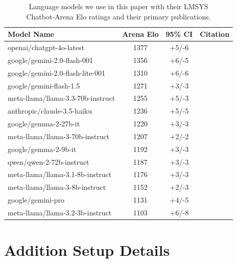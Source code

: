 \documentclass{article}
\begin{document}
\begin{table}[h]
    \centering
    \begin{tabular}{l|c|c|l}
        \toprule[0.4mm]
        \textbf{Model Name} & \textbf{Arena Elo} & \textbf{95\% CI} & \textbf{Citation} \\
        \midrule[0.4mm]
        openai/chatgpt-4o-latest           & 1377 & +5/-6  & \cite{openai2023gpt4} \\
        google/gemini-2.0-flash-001        & 1356 & +6/-5  & \cite{deepmind2024gemini15} \\
        google/gemini-2.0-flash-lite-001   & 1310 & +6/-6  & \cite{deepmind2024gemini15} \\
        google/gemini-flash-1.5            & 1271 & +3/-3  & \cite{deepmind2024gemini15} \\
        meta-llama/llama-3.3-70b-instruct  & 1255 & +5/-3  & \cite{touvron2024llama3} \\
        anthropic/claude-3.5-haiku         & 1236 & +5/-5  & \cite{anthropic2024haiku} \\
        google/gemma-2-27b-it              & 1220 & +3/-3  & \cite{gemma2024} \\
        meta-llama/llama-3-70b-instruct    & 1207 & +2/-2  & \cite{touvron2024llama3} \\
        google/gemma-2-9b-it               & 1192 & +3/-3  & \cite{gemma2024} \\
        qwen/qwen-2-72b-instruct           & 1187 & +3/-3  & \cite{yang2024qwen2} \\
        meta-llama/llama-3.1-8b-instruct   & 1176 & +3/-3  & \cite{touvron2024llama3} \\
        meta-llama/llama-3-8b-instruct     & 1152 & +2/-3  & \cite{touvron2024llama3} \\
        google/gemini-pro                  & 1131 & +4/-5  & \cite{deepmind2023gemini} \\
        meta-llama/llama-3.2-3b-instruct   & 1103 & +6/-8  & \cite{touvron2024llama3} \\
        \bottomrule[0.4mm]
    \end{tabular}
    \vspace{2mm}
    \caption{Language models we use in this paper with their LMSYS Chatbot‑Arena Elo ratings and their primary publications.}
    \label{tab:ai-models-Elo}
\end{table}



\section{Addition Setup Details}
\end{document}
